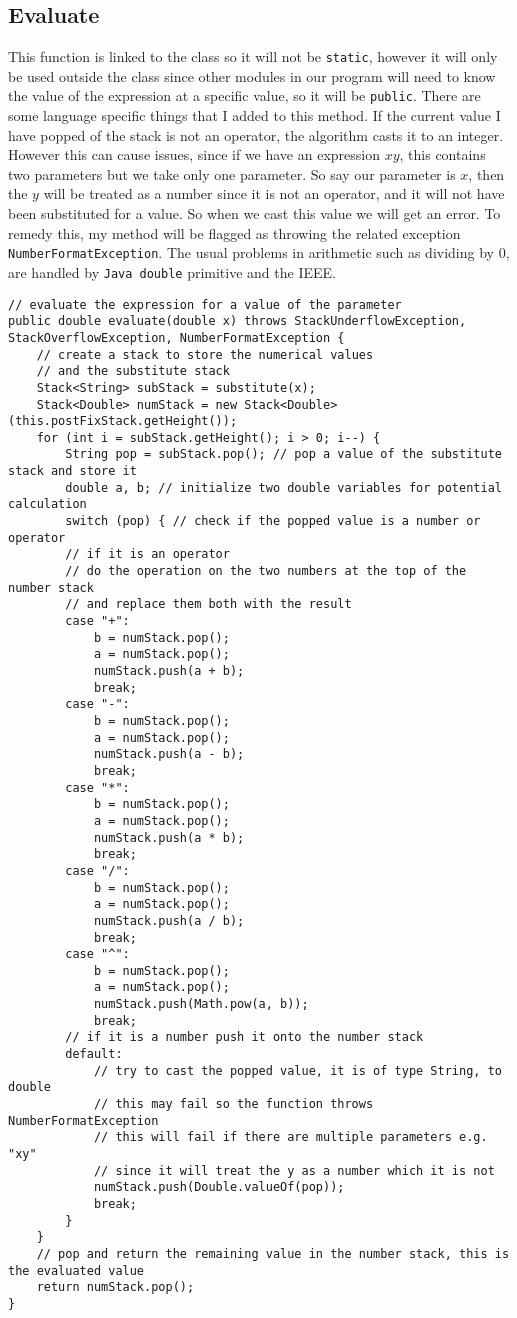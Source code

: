 \documentclass[../../../../main.tex]{subfiles}
\begin{document}
\subsection{Evaluate}
This function is linked to the class so it will not be \texttt{static}, however it will only be used outside the class since other modules in our program will need to know the value of the expression at a specific value, so it will be \texttt{public}. There are some language specific things that I added to this method. If the current value I have popped of the stack is not an operator, the algorithm casts it to an integer. However this can cause issues, since if we have an expression $xy$, this contains two parameters but we take only one parameter. So say our parameter is $x$, then the $y$ will be treated as a number since it is not an operator, and it will not have been substituted for a value. So when we cast this value we will get an error. To remedy this, my method will be flagged as throwing the related exception \texttt{NumberFormatException}. The usual problems in arithmetic such as dividing by 0, are handled by \texttt{Java double} primitive and the IEEE\cite{doubleJava, doubleIEEE}.
\begin{verbatim}
// evaluate the expression for a value of the parameter
public double evaluate(double x) throws StackUnderflowException, StackOverflowException, NumberFormatException {
	// create a stack to store the numerical values
	// and the substitute stack
	Stack<String> subStack = substitute(x);
	Stack<Double> numStack = new Stack<Double>(this.postFixStack.getHeight());
	for (int i = subStack.getHeight(); i > 0; i--) {
		String pop = subStack.pop(); // pop a value of the substitute stack and store it
		double a, b; // initialize two double variables for potential calculation
		switch (pop) { // check if the popped value is a number or operator
		// if it is an operator
		// do the operation on the two numbers at the top of the number stack
		// and replace them both with the result
		case "+":
			b = numStack.pop();
			a = numStack.pop();
			numStack.push(a + b);
			break;
		case "-":
			b = numStack.pop();
			a = numStack.pop();
			numStack.push(a - b);
			break;
		case "*":
			b = numStack.pop();
			a = numStack.pop();
			numStack.push(a * b);
			break;
		case "/":
			b = numStack.pop();
			a = numStack.pop();
			numStack.push(a / b);
			break;
		case "^":
			b = numStack.pop();
			a = numStack.pop();
			numStack.push(Math.pow(a, b));
			break;
		// if it is a number push it onto the number stack
		default:
			// try to cast the popped value, it is of type String, to double
			// this may fail so the function throws NumberFormatException
			// this will fail if there are multiple parameters e.g. "xy"
			// since it will treat the y as a number which it is not
			numStack.push(Double.valueOf(pop));
			break;
		}
	}
	// pop and return the remaining value in the number stack, this is the evaluated value
	return numStack.pop();
}
\end{verbatim}
\end{document}

